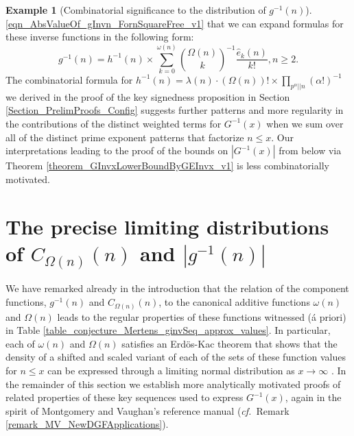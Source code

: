 \documentclass[11pt,reqno,a4letter]{article}
\numberwithin{figure}{section}
\numberwithin{table}{section}
\newcommand{\cf}{\textit{cf.\ }}
\theoremstyle{plain}
\numberwithin{theorem}{section}
\theoremstyle{definition}
\newtheorem{example}[theorem]{Example}
\begin{document}
\begin{example}[Combinatorial significance to the distribution of $g^{-1}(n)$]
\eqref{eqn_AbsValueOf_gInvn_FornSquareFree_v1} that we can expand formulas for 
these inverse functions in the following form: 
\[
g^{-1}(n) = h^{-1}(n) \times \sum_{k=0}^{\omega(n)} \binom{\Omega(n)}{k}^{-1} 
     \frac{\widehat{e}_k(n)}{k!}, n \geq 2. 
\]
The combinatorial formula for 
$h^{-1}(n) = \lambda(n) \cdot (\Omega(n))! \times \prod_{p^{\alpha} || n} (\alpha !)^{-1}$ 
we derived in the proof of the key signedness proposition in 
Section \ref{Section_PrelimProofs_Config} 
suggests further patterns and more regularity in the contributions of the distinct weighted 
terms for $G^{-1}(x)$ when we sum over all of the distinct prime exponent patterns that factorize 
$n \leq x$. 
Our interpretations leading to the proof of the bounds on $|G^{-1}(x)|$ from below via 
Theorem \ref{theorem_GInvxLowerBoundByGEInvx_v1} 
is less combinatorially motivated. 
\end{example} 

\newpage
\section{The precise limiting distributions of 
         $C_{\Omega(n)}(n)$ and $|g^{-1}(n)|$} 
\label{Section_NewFormulasForgInvn} 

We have remarked already in the introduction that the relation of the component 
functions, $g^{-1}(n)$ and $C_{\Omega(n)}(n)$, to the canonical additive functions 
$\omega(n)$ and $\Omega(n)$ leads to the regular properties of these functions 
witnessed (\'{a} priori) in Table \ref{table_conjecture_Mertens_ginvSeq_approx_values}. 
In particular, each of $\omega(n)$ and $\Omega(n)$ satisfies 
an Erd\"os-Kac theorem that shows that the density of a shifted and scaled variant of each 
of the sets of these function values for $n \leq x$ can be expressed through a 
limiting normal distribution as $x \rightarrow \infty$ 
\cite{ERDOS-KAC-REF,BILLINGSLY-CLT-PRIMEDIVFUNC,RENYI-TURAN}. 
In the remainder of this section we establish more analytically motivated proofs of 
related properties of these key sequences used to express $G^{-1}(x)$, 
again in the spirit of Montgomery and Vaughan's reference manual 
(\cf Remark \ref{remark_MV_NewDGFApplications}). 
\end{document}
